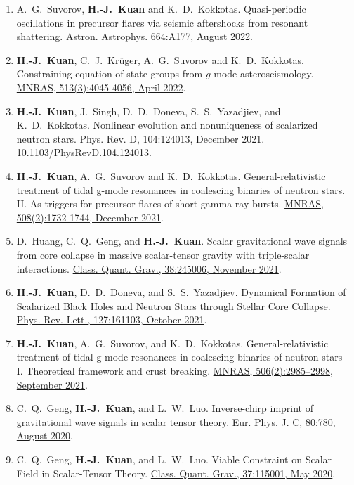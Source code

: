 \documentclass[11pt,a4paper,sans]{moderncv}
\begin{document}
\begin{enumerate}
	\item A.~G.~Suvorov, \textbf{H.-J.~Kuan} and K.~D.~Kokkotas. Quasi-periodic oscillations in precursor flares via seismic aftershocks from resonant shattering. \href{https://www.aanda.org/articles/aa/full_html/2022/08/aa44082-22/aa44082-22.html}{Astron. Astrophys. 664:A177, August 2022}.
	\item \textbf{H.-J.~Kuan}, C.~J.~Kr{\"u}ger, A.~G.~Suvorov and K.~D.~Kokkotas. Constraining equation of state groups from $g$-mode asteroseismology. \href{https://doi.org/10.1093/mnras/stac1101}{MNRAS, 513(3):4045-4056, April 2022}.
	\item \textbf{H.-J.~Kuan}, J.~Singh, D.~D.~Doneva, S.~S.~Yazadjiev, and K.~D.~Kokkotas. Nonlinear evolution and nonuniqueness of scalarized neutron stars. Phys. Rev. D, 104:124013, December 2021. \href{https://doi.org/10.1103/PhysRevD.104.124013}{10.1103/PhysRevD.104.124013}.
	\item \textbf{H.-J.~Kuan}, A.~G.~Suvorov and K.~D.~Kokkotas. General-relativistic treatment of tidal g-mode resonances in coalescing binaries of neutron stars. II. As triggers for precursor flares of short gamma-ray bursts. \href{https://doi.org/10.1093/mnras/stab2658}{MNRAS, 508(2):1732-1744, December 2021}.
	\item D.~Huang, C.~Q.~Geng, and \textbf{H.-J.~Kuan}. Scalar gravitational wave signals from core collapse in massive scalar-tensor gravity with triple-scalar interactions. \href{https://doi.org/10.1088/1361-6382/ac35ab}{Class. Quant. Grav., 38:245006, November 2021}.
	\item \textbf{H.-J.~Kuan}, D.~D.~Doneva, and S.~S.~Yazadjiev. Dynamical Formation of Scalarized Black Holes and Neutron Stars through Stellar Core Collapse. \href{https://doi.org/10.1103/PhysRevLett.127.161103}{Phys. Rev. Lett., 127:161103, October 2021}.
	\item \textbf{H.-J.~Kuan}, A.~G.~Suvorov, and K.~D.~Kokkotas. General-relativistic treatment of tidal g-mode resonances in coalescing binaries of neutron stars - I. Theoretical framework and crust breaking. \href{https://doi.org/10.1093/mnras/stab1898}{MNRAS, 506(2):2985–2998, September 2021}.
	\item C.~Q.~Geng, \textbf{H.-J.~Kuan}, and L.~W.~Luo. Inverse-chirp imprint of gravitational wave signals in scalar tensor theory. \href{https://doi.org/10.1140/epjc/s10052-020-8359-y}{Eur. Phys. J. C, 80:780, August 2020}.
	\item C.~Q.~Geng, \textbf{H.-J.~Kuan}, and L.~W.~Luo. Viable Constraint on Scalar Field in Scalar-Tensor Theory.	\href{https://doi.org/10.1088/1361-6382/ab86fb}{Class. Quant. Grav., 37:115001, May 2020}.
\end{enumerate}
\end{document}
